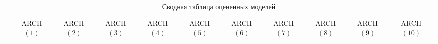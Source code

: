\begin{table}
	\centering
	\begin{tabular}{c|cccccccccc}
		\toprule
		& ARCH$(1)$ & ARCH$(2)$	& ARCH$(3)$	& ARCH$(4)$  & ARCH$(5)$  & ARCH$(6)$  & ARCH$(7)$ & ARCH$(8)$ & ARCH$(9)$ & ARCH$(10)$\\
		
		
	\end{tabular}
	\caption{Сводная таблица оцененных моделей}
\end{table}